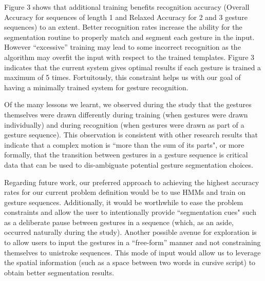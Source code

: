 \documentclass[twoside]{article}
\begin{document}
\begin{multicols}{2}
Figure 3 shows that additional training benefits recognition accuracy (Overall Accuracy for sequences of length 1 and Relaxed Accuracy for 2 and 3 gesture sequences) to an extent.
Better recognition rates increase the ability for the segmentation routine to properly match and segment each gesture in the input. However ``excessive'' training may lead to some incorrect recognition
as the algorithm may overfit the input with respect to the trained templates. 
Figure 3 indicates that the current system gives optimal results if each
gesture is trained a maximum of 5 times. Fortuitously, this constraint helps us with our goal of
having a minimally trained system for gesture recognition.




Of the many lessons we learnt, we
observed during the study that the gestures themselves were drawn differently
during training (when gestures were drawn individually) and during
recognition (when gestures were drawn as part of a gesture sequence). This
observation is consistent with other research results that indicate
that a complex motion is ``more than the sum of its parts", or more formally,
that the transition between gestures in a gesture sequence is critical
data that can be used to dis-ambiguate potential gesture segmentation choices.

Regarding future work, our preferred approach to achieving the highest accuracy
rates for our current problem definition would be to use HMMs and train on
gesture sequences. Additionally, it would be worthwhile to ease the problem
constraints and allow the user to intentionally provide ``segmentation cues"
such as a deliberate pause between gestures in a sequence (which, as an aside,
occurred naturally during the study). Another possible avenue for exploration is to
allow users to input the gestures in a ``free-form'' manner and not constraining themselves
to unistroke sequences. This mode of input would allow us to leverage the spatial information
(such as a space between two words in cursive script) to obtain better segmentation results.


\end{multicols}
\end{document}
